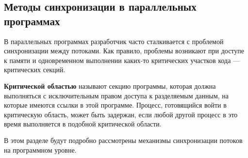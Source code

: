 \subsection{Методы синхронизации в параллельных программах}
\label{subsec:syncronization-methods}

В параллельных программах разработчик часто сталкивается с проблемой синхронизации между потоками.
Как правило, проблемы возникают при доступе к памяти и одновременном выполнении каких-то критических участков кода --- критических секций.

\textbf{Критической областью} называют секцию программы, которая должна выполняться с исключительным правом доступа к разделяемым данным, на которые имеются ссылки в этой программе.
Процесс, готовящийся войти в критическую область, может быть задержан, если любой другой процесс в это время выполняется в подобной критической области.

В этом разделе будут подробно рассмотрены механизмы синхронизации потоков на программном уровне.


